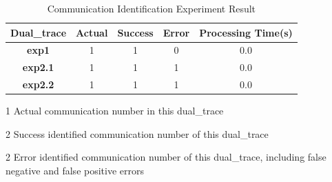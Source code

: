     \begin{table}[H]
        \centering
        \caption{Communication Identification Experiment Result}
        \label{expresult}
        \begin{threeparttable}
        \begin{tabular}{|c|c|c|c|c|}
            \hline
            \textbf{Dual\_trace}&\textbf{Actual}\tnote{1}& \textbf{Success}\tnote{2}& \textbf{Error}\tnote{3} & \textbf{Processing Time(s)} \\
             \hline
             \textbf{exp1} &1&1&0&0.0\\
            \hline
             \textbf{exp2.1}&1&1&1&    0.0\\
            \hline
             \textbf{exp2.2}&1&1&1&0.0\\
            \hline
        \end{tabular}
        \begin{tablenotes}
            \item[1] Actual communication number in this dual\_trace
            \item[2] Success identified communication number of this dual\_trace
            \item[2] Error identified communication number of this dual\_trace, including false negative and false positive errors
        \end{tablenotes}
        \end{threeparttable}
    \end{table}




